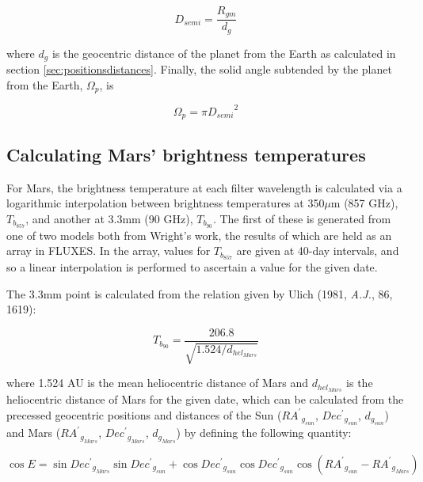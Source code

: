 \documentclass[11pt,twoside]{starlink}
\begin{document}
\begin{displaymath}
D_{semi} = \frac{R_{gm}}{d_g}
\end{displaymath}

where $d_g$ is the geocentric distance of the planet from the Earth as calculated in section \ref{sec:positionsdistances}.  Finally, the solid angle subtended by the planet from the Earth, $\Omega_p$, is

\begin{displaymath}
\Omega_p = \pi {D_{semi}}^2
\end{displaymath}

\subsection{Calculating Mars' brightness temperatures}
\label{sec:marsbright}

For Mars, the brightness temperature at each filter wavelength is calculated via a logarithmic interpolation between brightness temperatures at 350$\mu$m (857 GHz), $T_{b_{857}}$, and another at 3.3mm (90 GHz), $T_{b_{90}}$.  The first of these is generated from one of two models both from Wright's work, the results of which are held as an array in FLUXES.  In the array, values for $T_{b_{857}}$ are given at 40-day intervals, and so a linear interpolation is performed to ascertain a value for the given date.

The 3.3mm point is calculated from the relation given by Ulich (1981, \textit{A.J.}, 86, 1619):

\begin{displaymath}
T_{b_{90}} = \frac{206.8}{\sqrt{1.524/d_{hel_{Mars}}}}
\end{displaymath}

where 1.524 AU is the mean heliocentric distance of Mars and $d_{hel_{Mars}}$ is the heliocentric distance of Mars for the given date, which can be calculated from the precessed geocentric positions and distances of the Sun (${RA^\prime}_{g_{sun}}$, ${Dec^\prime}_{g_{sun}}$, $d_{g_{sun}}$) and Mars (${RA^\prime}_{g_{Mars}}$, ${Dec^\prime}_{g_{Mars}}$, $d_{g_{Mars}}$) by defining the following quantity:

\begin{displaymath}
\cos E = \sin {Dec^\prime}_{g_{Mars}} \sin {Dec^\prime}_{g_{sun}} + \cos {Dec^\prime}_{g_{sun}} \cos {Dec^\prime}_{g_{sun}} \cos ({RA^\prime}_{g_{sun}} - {RA^\prime}_{g_{Mars}})
\end{displaymath}
\end{document}
